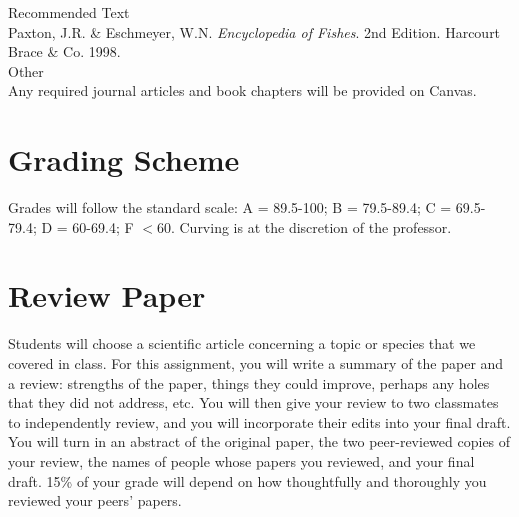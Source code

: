 \documentclass[a4paper]{inzane_syllabus} %
\begin{document}
{\color{myCOLOR} Recommended Text}\\
Paxton, J.R. \& Eschmeyer, W.N. \textit{Encyclopedia of Fishes}. 2nd Edition.
Harcourt Brace \& Co. 1998. \\

{\color{myCOLOR} Other}\\
Any required journal articles and book chapters will be provided on Canvas.


\vspace{0.5cm}
\section{Grading Scheme}

\begin{twentyshort}
\end{twentyshort}

Grades will follow the standard scale: A = 89.5-100; B = 79.5-89.4; C = 69.5-79.4;
D = 60-69.4; F $<$60. Curving is at the discretion of the professor. 



\vspace{0.5cm}
\section{Review Paper}

Students will choose a scientific article concerning a topic or species that we
covered in class. For this assignment, you will write a summary of the paper and
a review: strengths of the paper, things they could improve, perhaps any holes
that they did not address, etc. You will then give your review to two classmates
to independently review, and you will incorporate their edits into your final
draft. You will turn in an abstract of the original paper, the two peer-reviewed
copies of your review, the names of people whose papers you reviewed, and your
final draft. 15\% of your grade will depend on how thoughtfully and thoroughly
you reviewed your peers' papers.   
\end{document}
